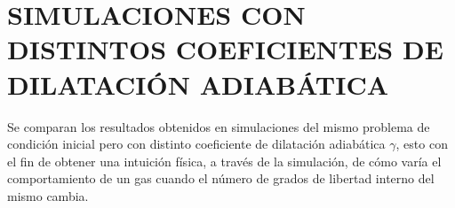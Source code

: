 \chapter{SIMULACIONES CON DISTINTOS COEFICIENTES DE DILATACIÓN ADIABÁTICA}
\label{cap:5}
Se comparan los resultados obtenidos en simulaciones del mismo problema de condición inicial pero con distinto coeficiente de dilatación adiabática $\gamma$, esto con el fin de obtener una intuición física, a través de la simulación, de cómo varía el comportamiento de un gas cuando el número de grados de libertad interno del mismo cambia.